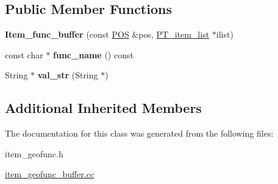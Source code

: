 \subsection*{Public Member Functions}
\begin{DoxyCompactItemize}
\item 
\mbox{\label{classItem__func__buffer_acd5600caa943a7a07b10220a0c282c5b}} 
{\bfseries Item\+\_\+func\+\_\+buffer} (const \mbox{\hyperlink{structYYLTYPE}{P\+OS}} \&pos, \mbox{\hyperlink{classPT__item__list}{P\+T\+\_\+item\+\_\+list}} $\ast$ilist)
\item 
\mbox{\label{classItem__func__buffer_a69871e461e1147e08a3bf42896e31ccd}} 
const char $\ast$ {\bfseries func\+\_\+name} () const
\item 
\mbox{\label{classItem__func__buffer_a21dfe8b7a1e211978c1754fd9e3799aa}} 
String $\ast$ {\bfseries val\+\_\+str} (String $\ast$)
\end{DoxyCompactItemize}
\subsection*{Additional Inherited Members}


The documentation for this class was generated from the following files\+:\begin{DoxyCompactItemize}
\item 
item\+\_\+geofunc.\+h\item 
\mbox{\hyperlink{item__geofunc__buffer_8cc}{item\+\_\+geofunc\+\_\+buffer.\+cc}}\end{DoxyCompactItemize}
